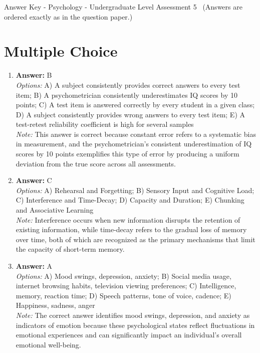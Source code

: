 \documentclass[12pt]{article}
\begin{document}
\begin{center}
Answer Key - Psychology - Undergraduate Level Assessment 5 \
\small (Answers are ordered exactly as in the question paper.)
\end{center}

\section*{Multiple Choice}
\begin{enumerate}[label=\arabic*.]
\item \textbf{Answer:} B
\\ \textit{Options:} A) A subject consistently provides correct answers to every test item; B) A psychometrician consistently underestimates IQ scores by 10 points; C) A test item is answered correctly by every student in a given class; D) A subject consistently provides wrong answers to every test item; E) A test-retest reliability coefficient is high for several samples
\\ \textit{Note:} This answer is correct because constant error refers to a systematic bias in measurement, and the psychometrician's consistent underestimation of IQ scores by 10 points exemplifies this type of error by producing a uniform deviation from the true score across all assessments.
\item \textbf{Answer:} C
\\ \textit{Options:} A) Rehearsal and Forgetting; B) Sensory Input and Cognitive Load; C) Interference and Time-Decay; D) Capacity and Duration; E) Chunking and Associative Learning
\\ \textit{Note:} Interference occurs when new information disrupts the retention of existing information, while time-decay refers to the gradual loss of memory over time, both of which are recognized as the primary mechanisms that limit the capacity of short-term memory.
\item \textbf{Answer:} A
\\ \textit{Options:} A) Mood swings, depression, anxiety; B) Social media usage, internet browsing habits, television viewing preferences; C) Intelligence, memory, reaction time; D) Speech patterns, tone of voice, cadence; E) Happiness, sadness, anger
\\ \textit{Note:} The correct answer identifies mood swings, depression, and anxiety as indicators of emotion because these psychological states reflect fluctuations in emotional experiences and can significantly impact an individual's overall emotional well-being.

\end{enumerate}
\end{document}
